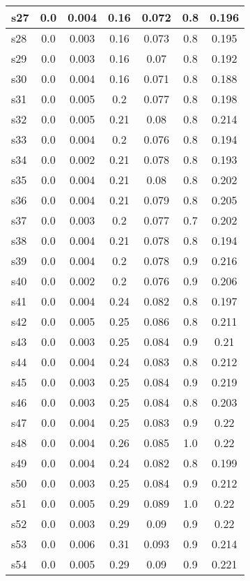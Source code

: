 \documentclass{article}
\begin{document}
\begin{tabular}{|l|c|c|c|c|c|c|}
\hline
s27 &0.0 & 0.004 & 0.16 & 0.072 & 0.8 & 0.196\\
\hline
s28 &0.0 & 0.003 & 0.16 & 0.073 & 0.8 & 0.195\\
\hline
s29 &0.0 & 0.003 & 0.16 & 0.07 & 0.8 & 0.192\\
\hline
s30 &0.0 & 0.004 & 0.16 & 0.071 & 0.8 & 0.188\\
\hline
s31 &0.0 & 0.005 & 0.2 & 0.077 & 0.8 & 0.198\\
\hline
s32 &0.0 & 0.005 & 0.21 & 0.08 & 0.8 & 0.214\\
\hline
s33 &0.0 & 0.004 & 0.2 & 0.076 & 0.8 & 0.194\\
\hline
s34 &0.0 & 0.002 & 0.21 & 0.078 & 0.8 & 0.193\\
\hline
s35 &0.0 & 0.004 & 0.21 & 0.08 & 0.8 & 0.202\\
\hline
s36 &0.0 & 0.004 & 0.21 & 0.079 & 0.8 & 0.205\\
\hline
s37 &0.0 & 0.003 & 0.2 & 0.077 & 0.7 & 0.202\\
\hline
s38 &0.0 & 0.004 & 0.21 & 0.078 & 0.8 & 0.194\\
\hline
s39 &0.0 & 0.004 & 0.2 & 0.078 & 0.9 & 0.216\\
\hline
s40 &0.0 & 0.002 & 0.2 & 0.076 & 0.9 & 0.206\\
\hline
s41 &0.0 & 0.004 & 0.24 & 0.082 & 0.8 & 0.197\\
\hline
s42 &0.0 & 0.005 & 0.25 & 0.086 & 0.8 & 0.211\\
\hline
s43 &0.0 & 0.003 & 0.25 & 0.084 & 0.9 & 0.21\\
\hline
s44 &0.0 & 0.004 & 0.24 & 0.083 & 0.8 & 0.212\\
\hline
s45 &0.0 & 0.003 & 0.25 & 0.084 & 0.9 & 0.219\\
\hline
s46 &0.0 & 0.003 & 0.25 & 0.084 & 0.8 & 0.203\\
\hline
s47 &0.0 & 0.004 & 0.25 & 0.083 & 0.9 & 0.22\\
\hline
s48 &0.0 & 0.004 & 0.26 & 0.085 & 1.0 & 0.22\\
\hline
s49 &0.0 & 0.004 & 0.24 & 0.082 & 0.8 & 0.199\\
\hline
s50 &0.0 & 0.003 & 0.25 & 0.084 & 0.9 & 0.212\\
\hline
s51 &0.0 & 0.005 & 0.29 & 0.089 & 1.0 & 0.22\\
\hline
s52 &0.0 & 0.003 & 0.29 & 0.09 & 0.9 & 0.22\\
\hline
s53 &0.0 & 0.006 & 0.31 & 0.093 & 0.9 & 0.214\\
\hline
s54 &0.0 & 0.005 & 0.29 & 0.09 & 0.9 & 0.221\\

\end{tabular}
\end{document}
